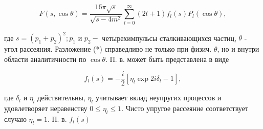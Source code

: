 \documentclass[10pt]{article}
\begin{document}
\[

F(s, \cos \theta)=\frac{16 \pi \sqrt{s}}{\sqrt{s-4 m^{2}}} \sum_{l=0}^{\infty}(2 l+1) f_{l}(s) P_{l}(\cos \theta),

\]



где $s=\left(p_{1}+p_{2}\right)^{2} ; p_{1}$ и $p_{2}-$ четырехимпульсы сталкивающихся частиц, $\theta$ - угол рассеяния. Разложение (*) справедливо не только при физич. $\theta$, но и внутри области аналитичности по $\cos \theta$. П. в. может быть представлена в виде



\[

f_{l}(s)=-\frac{i}{2}\left[\eta_{l} \exp 2 i \delta_{l}-1\right],

\]



где $\delta_{l}$ и $\eta_{l}$ действительны, $\eta_{l}$ учитывает вклад неупругих процессов и удовлетворяет неравенству $0 \leqslant \eta_{l} \leqslant 1$. Чисто упругое рассеяние соответствует случаю $\eta_{l}=1$. П. в. $f_{l}(s)$
\end{document}
